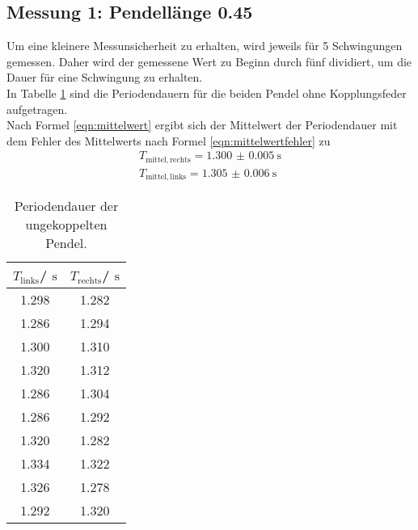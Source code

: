 \subsection{Messung 1: Pendellänge 0.45}
Um eine kleinere Messunsicherheit zu erhalten, wird jeweils für 5 Schwingungen gemessen. Daher wird der gemessene Wert zu Beginn durch fünf dividiert, um die Dauer für eine Schwingung zu erhalten.
\\In Tabelle \ref{tab:alinksrechts} sind die Periodendauern für die beiden Pendel ohne Kopplungsfeder aufgetragen.
\\Nach Formel \eqref{eqn:mittelwert} ergibt sich der Mittelwert der Periodendauer mit dem Fehler des Mittelwerts nach Formel \eqref{eqn:mittelwertfehler} zu
\begin{gather*}
	T_{\mathrm{mittel, rechts}}=\SI{1.300(5)}{\second}\\
	T_{\mathrm{mittel, links}}=\SI{1.305(6)}{\second}
\end{gather*}
\begin{table}
	\centering
	\caption{Periodendauer der ungekoppelten Pendel.}
	\label{tab:alinksrechts}
	\begin{tabular}{cc}
		\toprule
		$T_{\mathrm{links}}$/ $\si{\second}$ & $T_{\mathrm{rechts}}$/ $\si{\second}$ \\
		\midrule
		1.298                                & 1.282                                 \\
		1.286                                & 1.294                                 \\
		1.300                                & 1.310                                 \\
		1.320                                & 1.312                                 \\
		1.286                                & 1.304                                 \\
		1.286                                & 1.292                                 \\
		1.320                                & 1.282                                 \\
		1.334                                & 1.322                                 \\
		1.326                                & 1.278                                 \\
		1.292                                & 1.320                                 \\
		\bottomrule
	\end{tabular}
\end{table}



